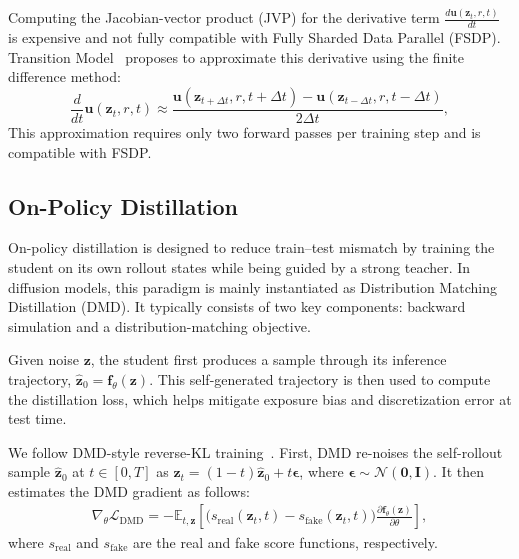  Computing the Jacobian-vector product (JVP) for the derivative term $\frac{d\mathbf{u}(\mathbf{z}_t, r, t)}{dt}$ is expensive and not fully compatible with Fully Sharded Data Parallel (FSDP). Transition Model~\cite{wang2025transition} proposes to approximate this derivative using the finite difference method:
\begin{equation}
    \label{eq:center_difference}
  \frac{d}{dt}\mathbf{u}(\mathbf{z}_t, r, t) \approx \frac{\mathbf{u}(\mathbf{z}_{t+\Delta t}, r, t+\Delta t) - \mathbf{u}(\mathbf{z}_{t-\Delta t}, r, t-\Delta t)}{2\Delta t},
\end{equation}
This approximation requires only two forward passes per training step and is compatible with FSDP.

\subsection{On-Policy Distillation}
\label{sec:on_policy_distillation}
On-policy distillation is designed to reduce train--test mismatch by training the student on its own rollout states while being guided by a strong teacher. In diffusion models, this paradigm is mainly instantiated as Distribution Matching Distillation (DMD). It typically consists of two key components: backward simulation and a distribution-matching objective.

Given noise $\mathbf{z}$, the student first produces a sample through its inference trajectory,
$\hat{\mathbf{z}}_0 = \mathbf{f}_\theta(\mathbf{z})$.
This self-generated trajectory is then used to compute the distillation loss, which helps mitigate exposure bias and discretization error at test time.

We follow DMD-style reverse-KL training~\cite{yin2024one,yin2024improved}. First, DMD re-noises the self-rollout sample $\hat{\mathbf{z}}_0$ at $t\in[0,T]$ as $\mathbf{z}_t=(1-t)\hat{\mathbf{z}}_0+t\boldsymbol{\epsilon}$, where $\boldsymbol{\epsilon}\sim\mathcal{N}(\mathbf{0},\mathbf{I})$. It then estimates the DMD gradient as follows:
\begin{align}
  \label{eq:DMD_gradient}
  \nabla_\theta \mathcal{L}_{\text{DMD}}
  = -\mathbb{E}_{t,\mathbf{z}}\left[
    \big(s_{\text{real}}(\mathbf{z}_t,t)-s_{\text{fake}}(\mathbf{z}_t,t)\big)
    \frac{\partial \mathbf{f}_\theta(\mathbf{z})}{\partial \theta}
  \right],
\end{align}
where $s_{\text{real}}$ and $s_{\text{fake}}$ are the real and fake score functions, respectively.


